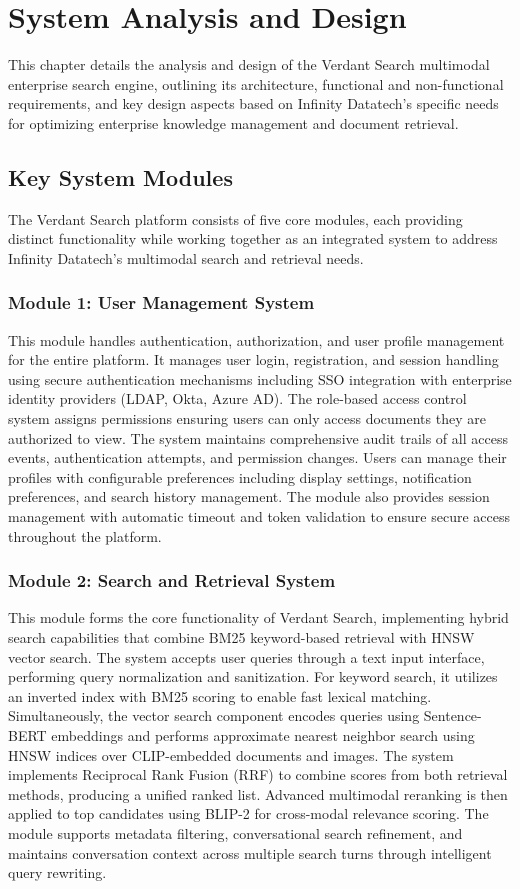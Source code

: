 \chapter{System Analysis and Design}
This chapter details the analysis and design of the Verdant Search multimodal enterprise search engine, outlining its architecture, functional and non-functional requirements, and key design aspects based on Infinity Datatech's specific needs for optimizing enterprise knowledge management and document retrieval.

\section{Key System Modules}
The Verdant Search platform consists of five core modules, each providing distinct functionality while working together as an integrated system to address Infinity Datatech's multimodal search and retrieval needs.

\subsection{Module 1: User Management System}
This module handles authentication, authorization, and user profile management for the entire platform. It manages user login, registration, and session handling using secure authentication mechanisms including SSO integration with enterprise identity providers (LDAP, Okta, Azure AD). The role-based access control system assigns permissions ensuring users can only access documents they are authorized to view. The system maintains comprehensive audit trails of all access events, authentication attempts, and permission changes. Users can manage their profiles with configurable preferences including display settings, notification preferences, and search history management. The module also provides session management with automatic timeout and token validation to ensure secure access throughout the platform.

\subsection{Module 2: Search and Retrieval System}
This module forms the core functionality of Verdant Search, implementing hybrid search capabilities that combine BM25 keyword-based retrieval with HNSW vector search. The system accepts user queries through a text input interface, performing query normalization and sanitization. For keyword search, it utilizes an inverted index with BM25 scoring to enable fast lexical matching. Simultaneously, the vector search component encodes queries using Sentence-BERT embeddings and performs approximate nearest neighbor search using HNSW indices over CLIP-embedded documents and images. The system implements Reciprocal Rank Fusion (RRF) to combine scores from both retrieval methods, producing a unified ranked list. Advanced multimodal reranking is then applied to top candidates using BLIP-2 for cross-modal relevance scoring. The module supports metadata filtering, conversational search refinement, and maintains conversation context across multiple search turns through intelligent query rewriting.

